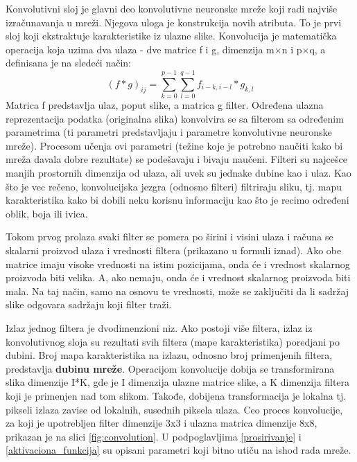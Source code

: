 \documentclass[a4paper]{article}
\begin{document}
Konvolutivni sloj je glavni deo konvolutivne neuronske mreže koji radi najviše izračunavanja u mreži. Njegova uloga je konstrukcija novih atributa. To je prvi sloj koji ekstraktuje karakteristike iz ulazne slike. Konvolucija je matematička operacija koja uzima dva ulaza - dve matrice f i g, dimenzija m$\times$n i p$\times$q, a definisana je na sledeći način:
$$(f * g)_{ij} = \sum_{k=0}^{p-1} \sum_{l=0}^{q-1} f_{i-k, i-l}*g_{k, l}$$
Matrica f predstavlja ulaz, poput slike, a matrica g filter. Određena ulazna reprezentacija podatka (originalna slika) konvolvira se sa filterom sa određenim parametrima (ti parametri predstavljaju i parametre konvolutivne neuronske mreže). Procesom učenja ovi parametri (težine koje je potrebno naučiti kako bi mreža davala dobre rezultate) se podešavaju i bivaju naučeni. Filteri su najcešce manjih prostornih dimenzija od ulaza, ali uvek su jednake dubine kao i ulaz. Kao što je vec rečeno, konvolucijska jezgra (odnosno filteri) filtriraju sliku, tj. mapu karakteristika kako bi dobili neku korisnu informaciju kao što je recimo određeni oblik, boja ili ivica.

Tokom prvog prolaza svaki filter se pomera po širini i visini ulaza i računa se skalarni proizvod ulaza i vrednosti filtera (prikazano u formuli iznad). Ako obe matrice imaju visoke vrednosti na istim pozicijama, onda će i vrednost skalarnog proizvoda biti velika. A, ako nemaju, onda će i vrednost skalarnog proizvoda biti mala. Na taj način, samo na osnovu te vrednosti, može se zaključiti da li sadržaj slike odgovara sadržaju koji filter traži.

Izlaz jednog filtera je dvodimenzioni niz. Ako postoji više filtera, izlaz iz konvolutivnog sloja su rezultati svih filtera (mape karakteristika) poredjani po dubini. Broj mapa karakteristika na izlazu, odnosno broj primenjenih filtera, predstavlja \textbf{dubinu mreže}. Operacijom konvolucije dobija se transformirana slika dimenzije I*K, gde je I dimenzija ulazne matrice slike, a K dimenzija filtera koji je primenjen nad tom slikom. Takođe, dobijena transformacija je lokalna tj. pikseli izlaza zavise od lokalnih, susednih piksela ulaza. Ceo proces konvolucije, za koji je upotrebljen filter dimenzije 3x3 i ulazna matrica dimenzije 8x8, prikazan je na slici \ref{fig:convolution}. U podpoglavljima \ref{prosirivanje} i \ref{aktivaciona_funkcija} su opisani parametri koji bitno utiču na ishod rada mreže.


\end{document}

